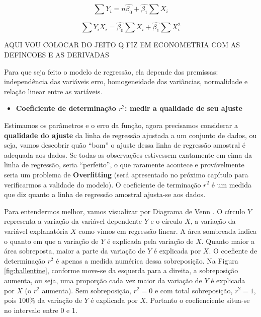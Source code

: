 \documentclass[
]{book}
\providecommand{\tightlist}{%
  \setlength{\itemsep}{0pt}\setlength{\parskip}{0pt}}
\begin{document}
\begin{equation}
    \sum Y_i=n\hat{\beta_0} + \hat{\beta_1} \sum X_i
    \label{eq:sumyi}
\end{equation}

\begin{equation}
    \sum Y_i X_i=\hat{\beta_0} \sum X_i + \hat{\beta_1} \sum X_i^2
    \label{eq:sumyixi}
\end{equation}

AQUI VOU COLOCAR DO JEITO Q FIZ EM ECONOMETRIA COM AS DEFINCOES E AS DERIVADAS

Para que seja feito o modelo de regressão, ela depende das premissas: independência das variáveis erro, homogeneidade das variâncias, normalidade e relação linear entre as variáveis.

\begin{itemize}
\tightlist
\item
  \textbf{Coeficiente de determinação \(r^2\): medir a qualidade de seu ajuste}
\end{itemize}

Estimamos os parâmetros e o erro da função, agora precisamos considerar a \textbf{qualidade do ajuste} da linha de regressão ajustada a um conjunto de dados, ou seja, vamos descobrir quão ``bom'' o ajuste dessa linha de regressão
amostral é adequada aos dados. Se todas as observações estivessem exatamente em cima da linha de regressão, seria ``perfeito'', o que raramente acontece e provávelmente seria um problema de \textbf{Overfitting} (será apresentado no próximo capítulo para verificarmos a validade do modelo). O coeficiente de terminação \(r^2\) é um medida que diz quanto a linha de regressão
amostral ajusta-se aos dados.

Para entendermos melhor, vamos visualizar por Diagrama de Venn \citep{kennedy1981ballentine}. O círculo \(Y\) representa a variação da variável dependente \(Y\) e o círculo \(X\), a variação da variável explanatória \(X\) como vimos em regressão linear. A área sombreada indica o quanto em que a variação de \(Y\) é explicada pela variação de \(X\). Quanto maior a área sobreposta, maior a parte da variação de \(Y\) é explicada por \(X\). O coefiente de determinação \(r^2\) é apenas a medida numérica dessa sobreposição. Na Figura \ref{fig:ballentine}, conforme move-se da esquerda para a direita, a sobreposição aumenta, ou seja, uma proporção cada vez maior da variação de \(Y\)
é explicada por \(X\) (o \(r^2\) aumenta). Sem sobreposição, \(r^2=0\) e com total sobreposição, \(r^2=1\), pois 100\% da variação de \(Y\) é explicada por \(X\). Portanto o coefienciente situa-se no intervalo entre 0 e 1.
\end{document}
